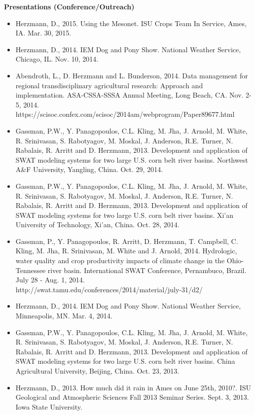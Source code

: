 \normalsize \sf
\normalsize \bf Presentations (Conference/Outreach)
\normalsize \sf
\begin{itemize}
\item Herzmann, D., 2015. Using the Mesonet. ISU Crops Team In Service, Ames, IA. Mar. 30, 2015.
\item Herzmann, D., 2014. IEM Dog and Pony Show. National Weather Service, Chicago, IL. Nov. 10, 2014.
\item Abendroth, L., D. Herzmann and L. Bunderson, 2014. Data management for regional transdisciplinary agricultural research: Approach and implementation. ASA-CSSA-SSSA Annual Meeting, Long Beach, CA. Nov. 2-5, 2014. https://scisoc.confex.com/scisoc/2014am/webprogram/Paper89677.html
\item Gassman, P.W., Y. Panagopoulos, C.L. Kling, M. Jha, J. Arnold, M. White, R. Srinivasan, S. Rabotyagov, M. Moskal, J. Anderson, R.E. Turner, N. Rabalais, R. Arritt and D. Herzmann, 2013. Development and application of SWAT modeling systems for two large U.S. corn belt river basins. Northwest A\&F University, Yangling, China. Oct. 29, 2014. 
\item Gassman, P.W., Y. Panagopoulos, C.L. Kling, M. Jha, J. Arnold, M. White, R. Srinivasan, S. Rabotyagov, M. Moskal, J. Anderson, R.E. Turner, N. Rabalais, R. Arritt and D. Herzmann, 2013. Development and application of SWAT modeling systems for two large U.S. corn belt river basins. Xi'an University of Technology, Xi'an, China. Oct. 28, 2014. 
\item Gassman, P., Y. Panagopoulos, R. Arritt, D. Herzmann, T. Campbell, C. Kling, M. Jha, R. Srinivasan, M. White and J. Arnold, 2014. Hydrologic, water quality and crop productivity impacts of climate change in the Ohio-Tennessee river basin. International SWAT Conference, Pernambuco, Brazil. July 28 - Aug. 1, 2014. http://swat.tamu.edu/conferences/2014/material/july-31/d2/
\item Herzmann, D., 2014. IEM Dog and Pony Show. National Weather Service, Minneapolis, MN. Mar. 4, 2014.
\item Gassman, P.W., Y. Panagopoulos, C.L. Kling, M. Jha, J. Arnold, M. White, R. Srinivasan, S. Rabotyagov, M. Moskal, J. Anderson, R.E. Turner, N. Rabalais, R. Arritt and D. Herzmann, 2013. Development and application of SWAT modeling systems for two large U.S. corn belt river basins. China Agricultural University, Beijing, China. Oct. 23, 2013. 
\item Herzmann, D., 2013. How much did it rain in Ames on June 25th, 2010?. ISU Geological and Atmospheric Sciences Fall 2013 Seminar Series. Sept. 3, 2013. Iowa State University. 

\end{itemize}
